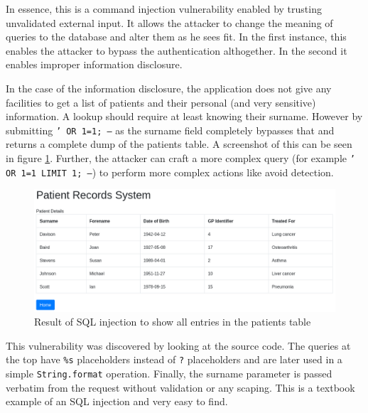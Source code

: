 \documentclass[10pt]{article}
\begin{document}
            In essence, this is a command injection vulnerability enabled by
            trusting unvalidated external input. It allows the attacker to
            change the meaning of queries to the database and alter them as he
            sees fit. In the first instance, this enables the attacker to
            bypass the authentication althogether. In the second it enables
            improper information disclosure.

            In the case of the information disclosure, the application does not
            give any facilities to get a list of patients and their personal
            (and very sensitive) information. A lookup should require at least
            knowing their surname. However by submitting \texttt{' OR 1=1; --}
            as the surname field completely bypasses that and returns a
            complete dump of the patients table. A screenshot of this can be
            seen in figure \ref{injection}. Further, the attacker can craft a
            more complex query (for example \texttt{' OR 1=1 LIMIT 1; --}) to
            perform more complex actions like avoid detection.

            \begin{figure}[h!]
                \includegraphics[width=\textwidth]{injection}
                \caption{Result of SQL injection to show all entries in the patients table}
                \label{injection}
            \end{figure}

            This vulnerability was discovered by looking at the source code.
            The queries at the top have \texttt{\%s} placeholders instead of
            \texttt{?} placeholders and are later used in a simple
            \texttt{String.format} operation. Finally, the surname parameter is
            passed verbatim from the request without validation or any scaping.
            This is a textbook example of an SQL injection and very easy to
            find.
\end{document}
